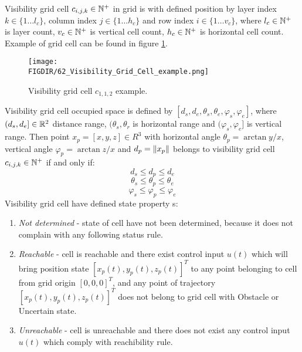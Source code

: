 \begin{definition}{Visibility grid cell $c_{i,j,k}\in\mathbb{N}^+$}\label{def:visibilityGridCell}
    in grid is with defined position by layer index $k\in\{1\dots l_c\}$, column index $j\in\{1\dots h_c\}$ and  row index $i\in\{1\dots v_c\}$, where $l_c\in\mathbb{N}^+$ is layer count, $v_c\in\mathbb{N}^+$ is vertical cell count, $h_c\in\mathbb{N}^+$ is horizontal cell count. Example of grid cell can be found in figure \ref{fig:62VisibilityGridCellExample}.
    \begin{figure}[H]
        \centering
        \texttt{[image: \\FIGDIR/62\_Visibility\_Grid\_Cell\_example.png]}
        \caption{Visibility grid cell $c_{1,1,2}$ example.}
        \label{fig:62VisibilityGridCellExample}
    \end{figure}
    Visibility grid cell occupied space is defined by $[d_s,d_e,\theta_s,\theta_e,\varphi_s,\varphi_e]$, where $(d_s,d_e]\in\mathbb{R}^2$ distance range, $(\theta_s,\theta_r$ is horizontal range and $(\varphi_s,\varphi_e]$ is vertical range. Then point $x_p=[x,y,z]\in R^3$ with horizontal angle $\theta_p = \arctan y/x$, vertical angle $\varphi_p=\arctan z/x$  and $d_p=\left\lVert x_p\right\rVert$ belongs to visibility grid cell $c_{i,j,k}\in\mathbb{N}^+$ if and only if:
    \begin{equation}
        d_s \le d_p \le d_e
    \end{equation}
    \begin{equation}
        \theta_s \le \theta_p \le \theta_e
    \end{equation}
    \begin{equation}
        \varphi_s \le \varphi_p \le \varphi_e
    \end{equation}
    \newpage\noindent    
    Visibility grid cell have defined state property s:
    \begin{enumerate}
        \item \textit{Not determined} - state of cell have not been determined, because it does not complain with any following status rule.
        \item \textit{Reachable} - cell is reachable and there exist control input $u(t)$ which will bring position state $[x_p(t),y_p(t),z_p(t)]^T$ to any point belonging to cell from grid origin $[0,0,0]^T$, and any point of trajectory $[x_p(t),y_p(t),z_p(t)]^T$ does not belong to grid cell with Obstacle or Uncertain state.
        \item \textit{Unreachable} - cell is unreachable and there does not exist any control input $u(t)$ which comply with reachibility rule.

\end{enumerate}
\end{definition}
